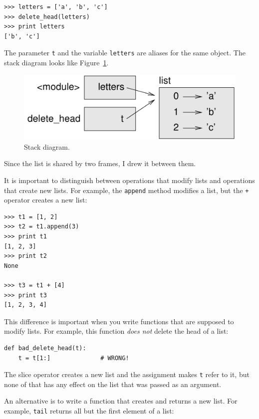 \documentclass[10pt]{book}
\begin{document}
\begin{verbatim}
>>> letters = ['a', 'b', 'c']
>>> delete_head(letters)
>>> print letters
['b', 'c']
\end{verbatim}
%
The parameter {\tt t} and the variable {\tt letters} are
aliases for the same object.  The stack diagram looks like
Figure~\ref{fig.stack5}.

\begin{figure}
\centerline
{\includegraphics[scale=0.8]{figs/stack5.pdf}}
\caption{Stack diagram.}
\label{fig.stack5}
\end{figure}


Since the list is shared by two frames, I drew
it between them.

It is important to distinguish between operations that
modify lists and operations that create new lists.  For
example, the {\tt append} method modifies a list, but the
{\tt +} operator creates a new list:

\begin{verbatim}
>>> t1 = [1, 2]
>>> t2 = t1.append(3)
>>> print t1
[1, 2, 3]
>>> print t2
None

>>> t3 = t1 + [4]
>>> print t3
[1, 2, 3, 4]
\end{verbatim}

This difference is important when you write functions that
are supposed to modify lists.  For example, this function
{\em does not} delete the head of a list:

\begin{verbatim}
def bad_delete_head(t):
    t = t[1:]              # WRONG!
\end{verbatim}

The slice operator creates a new list and the assignment
makes {\tt t} refer to it, but none of that has any effect
on the list that was passed as an argument.

An alternative is to write a function that creates and
returns a new list.  For
example, {\tt tail} returns all but the first
element of a list:
\end{document}
